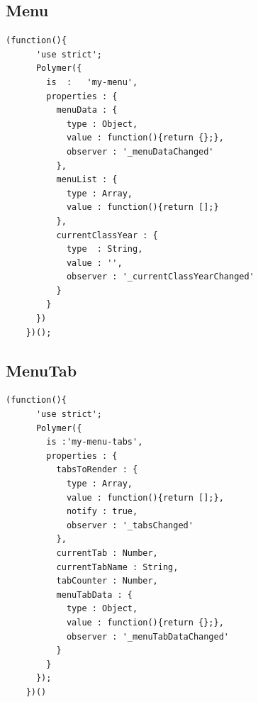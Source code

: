 \subsection{Menu}
\begin{lstlisting}[caption={}, label={lst:}]
    (function(){
      'use strict';
      Polymer({
        is  :   'my-menu',
        properties : {
          menuData : {
            type : Object,
            value : function(){return {};},
            observer : '_menuDataChanged'
          },
          menuList : {
            type : Array,
            value : function(){return [];}
          },
          currentClassYear : {
            type  : String,
            value : '',
            observer : '_currentClassYearChanged'
          }
        }
      })
    })();
\end{lstlisting}

\subsection{MenuTab}
\begin{lstlisting}[caption={}, label={lst:}]
        (function(){
      'use strict';
      Polymer({
        is :'my-menu-tabs',
        properties : {
          tabsToRender : {
            type : Array,
            value : function(){return [];},
            notify : true,
            observer : '_tabsChanged'
          },
          currentTab : Number,
          currentTabName : String,
          tabCounter : Number,
          menuTabData : {
            type : Object,
            value : function(){return {};},
            observer : '_menuTabDataChanged'
          }
        }
      });
    })()
\end{lstlisting}

